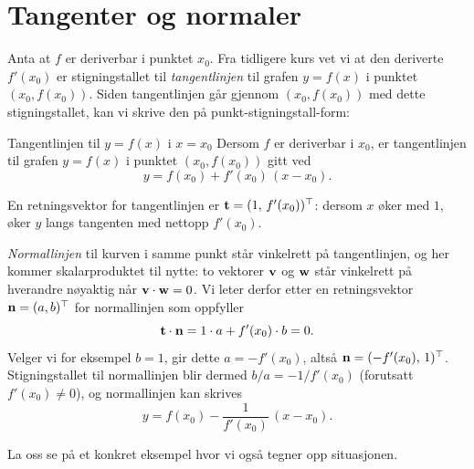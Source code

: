 \section{Tangenter og normaler}

Anta at $f$ er deriverbar i punktet $x_0$. Fra tidligere kurs vet vi at den deriverte $f'(x_0)$ er stigningstallet til \emph{tangentlinjen} til grafen $y=f(x)$ i punktet $(x_0,f(x_0))$. Siden tangentlinjen går gjennom $(x_0,f(x_0))$ med dette stigningstallet, kan vi skrive den på punkt-stigningstall-form:

\begin{defn}{Tangentlinjen til $y=f(x)$ i $x=x_0$}
Dersom $f$ er deriverbar i $x_0$, er tangentlinjen til grafen $y=f(x)$ i punktet $(x_0,f(x_0))$ gitt ved
\[
y = f(x_0) + f'(x_0)\,(x-x_0).
\]
\label{defn:tangentlinje}
\end{defn}

En retningsvektor for tangentlinjen er $\mathbf{t} = (1,\, f'(x_0))^\top$: dersom $x$ øker med $1$, øker $y$ langs tangenten med nettopp $f'(x_0)$.

\emph{Normallinjen} til kurven i samme punkt står vinkelrett på tangentlinjen, og her kommer skalarproduktet til nytte: to vektorer $\mathbf{v}$ og $\mathbf{w}$ står vinkelrett på hverandre nøyaktig når $\mathbf{v}\cdot\mathbf{w}=0$. Vi leter derfor etter en retningsvektor $\mathbf{n}=(a,b)^\top$ for normallinjen som oppfyller
\[
\mathbf{t}\cdot\mathbf{n} = 1\cdot a + f'(x_0)\cdot b = 0.
\]
Velger vi for eksempel $b=1$, gir dette $a = -f'(x_0)$, altså $\mathbf{n} = (-f'(x_0),\,1)^\top$. Stigningstallet til normallinjen blir dermed $b/a = -1/f'(x_0)$ (forutsatt $f'(x_0)\neq 0$), og normallinjen kan skrives
\[
y = f(x_0) - \frac{1}{f'(x_0)}\,(x-x_0).
\]

La oss se på et konkret eksempel hvor vi også tegner opp situasjonen.

